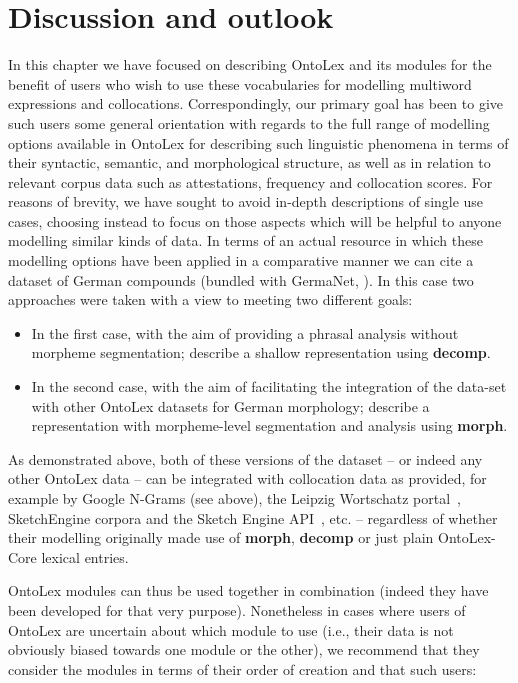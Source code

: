 \documentclass[output=paper,colorlinks,citecolor=brown]{langscibook}
\begin{document}
\section{Discussion and outlook} %
\label{sec:app}
In this chapter we have focused on describing OntoLex and its modules for the benefit of users who wish to use these vocabularies for modelling multiword expressions and collocations. Correspondingly, our primary goal has been to give such users some general orientation with regards to the full range of modelling options available in OntoLex for describing such linguistic phenomena in terms of their syntactic, semantic, and morphological structure, as well as in relation to relevant corpus data such as attestations, frequency and collocation scores. For reasons of brevity, we have sought to avoid in-depth descriptions of single use cases, choosing instead to focus on those aspects which will be helpful to anyone modelling similar kinds of data. In terms of an actual resource in which these modelling options have been applied in a comparative manner we can cite a dataset of German compounds (bundled with GermaNet, \citealt{hamp1997germanet}). In this case two approaches were taken with a view to meeting two different goals:

\begin{itemize}
    \item In the first case, with the aim of providing a phrasal analysis without morpheme segmentation; \citet{declerck2016towards} describe a shallow representation using \textbf{decomp}.
    \item In the second case, with the aim of facilitating the integration of the data-set with other OntoLex datasets for German morphology; \citet{chiarcos-etal-2022-lrec-morph} describe a representation with morpheme-level segmentation and analysis using \textbf{morph}.
\end{itemize}

\noindent
As demonstrated above, both of these versions of the dataset -- or indeed any other OntoLex data -- can be integrated with collocation data as provided, for example by Google N-Grams (see above), the Leipzig Wortschatz portal~\citep{goldhahn2012building}, Sketch\-En\-gi\-ne corpora and the Sketch Engine API~\citep{kilgarriff2014sketch}, etc. -- regardless of whether their modelling originally made use of \textbf{morph}, \textbf{decomp} or just plain OntoLex-Core lexical entries.

OntoLex modules can thus be used together in combination (indeed they have been developed for that very purpose). Nonetheless in cases where users of OntoLex are uncertain about which module to use (i.e., their data is not obviously biased towards one module or the other), we recommend that they consider the modules in terms of their order of creation and that such users:
\end{document}
